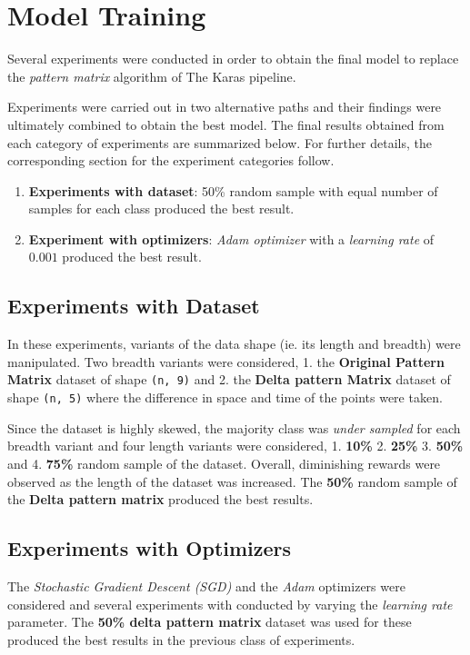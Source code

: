 \section{Model Training}
Several experiments were conducted in order to obtain the final model
to replace the \textit{pattern matrix} algorithm of The Karas
pipeline.

Experiments were carried out in two alternative paths and their
findings were ultimately combined to obtain the best model. The final
results obtained from each category of experiments are summarized
below. For further details, the corresponding section for the
experiment categories follow.

\begin{enumerate}
\item \textbf{Experiments with dataset}: 50\% random sample with equal
  number of samples for each class produced the best result.
\item \textbf{Experiment with optimizers}: \textit{Adam optimizer} with a
  \textit{learning rate} of $0.001$ produced the best result.
\end{enumerate}

\subsection{Experiments with Dataset}
In these experiments, variants of the data shape (ie. its length and
breadth) were manipulated. Two breadth variants were considered, 1.
the \textbf{Original Pattern Matrix} dataset of shape \texttt{(n, 9)}
and 2. the \textbf{Delta pattern Matrix} dataset of shape \texttt{(n,
  5)} where the difference in space and time of the points were taken.

Since the dataset is highly skewed, the majority class was
\textit{under sampled} for each breadth variant and four length
variants were considered, 1. \textbf{10\%} 2. \textbf{25\%} 3.
\textbf{50\%} and 4. \textbf{75\%} random sample of the dataset.
Overall, diminishing rewards were observed as the length of the
dataset was increased. The \textbf{50\%} random sample of the
\textbf{Delta pattern matrix} produced the best results.

\subsection{Experiments with Optimizers}
The \textit{Stochastic Gradient Descent (SGD)} and the \textit{Adam}
optimizers were considered and several experiments with conducted by
varying the \textit{learning rate} parameter. The \textbf{50\% delta
  pattern matrix} dataset was used for these produced the best results
in the previous class of experiments.

